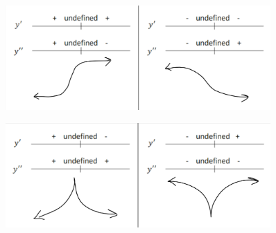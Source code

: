 \documentclass{article}
\begin{document}
\begin{figure}[h]
\begin{minipage}{0.45\textwidth}
    \end{minipage}
\end{figure}
\begin{figure}[h]
    \centering
    \includegraphics[width=0.9\textwidth]{imgs/diagram_5_6.png}
\end{figure}
\begin{figure}[h]
    \centering
    \includegraphics[width=0.9\textwidth]{imgs/diagram_7_8.png}
\end{figure}
\end{document}
